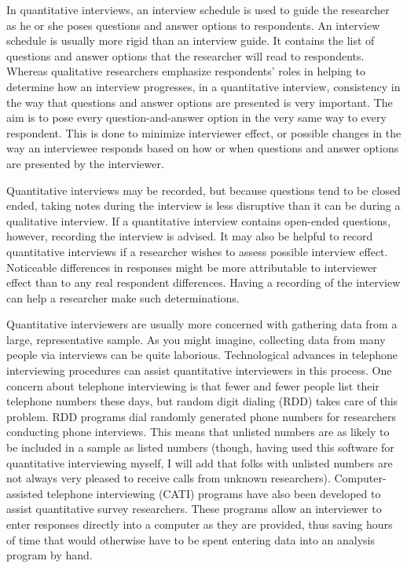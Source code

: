 In quantitative interviews, an interview schedule is used to guide the researcher as he or she poses questions and answer options to respondents. An interview schedule is usually more rigid than an interview guide. It contains the list of questions and answer options that the researcher will read to respondents. Whereas qualitative researchers emphasize respondents’ roles in helping to determine how an interview progresses, in a quantitative interview, consistency in the way that questions and answer options are presented is very important. The aim is to pose every question-and-answer option in the very same way to every respondent. This is done to minimize interviewer effect, or possible changes in the way an interviewee responds based on how or when questions and answer options are presented by the interviewer.

Quantitative interviews may be recorded, but because questions tend to be closed ended, taking notes during the interview is less disruptive than it can be during a qualitative interview. If a quantitative interview contains open-ended questions, however, recording the interview is advised. It may also be helpful to record quantitative interviews if a researcher wishes to assess possible interview effect. Noticeable differences in responses might be more attributable to interviewer effect than to any real respondent differences. Having a recording of the interview can help a researcher make such determinations.

Quantitative interviewers are usually more concerned with gathering data from a large, representative sample. As you might imagine, collecting data from many people via interviews can be quite laborious. Technological advances in telephone interviewing procedures can assist quantitative interviewers in this process. One concern about telephone interviewing is that fewer and fewer people list their telephone numbers these days, but random digit dialing (RDD) takes care of this problem. RDD programs dial randomly generated phone numbers for researchers conducting phone interviews. This means that unlisted numbers are as likely to be included in a sample as listed numbers (though, having used this software for quantitative interviewing myself, I will add that folks with unlisted numbers are not always very pleased to receive calls from unknown researchers). Computer-assisted telephone interviewing (CATI) programs have also been developed to assist quantitative survey researchers. These programs allow an interviewer to enter responses directly into a computer as they are provided, thus saving hours of time that would otherwise have to be spent entering data into an analysis program by hand.

